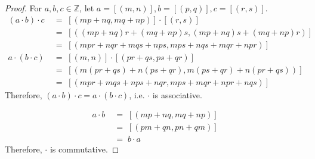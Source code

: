 \documentclass[10pt]{article}
\theoremstyle{definition}
\theoremstyle{remark}
\newcommand{\Z}{\mathbb{Z}}
\begin{document}
\begin{proof}
                For $a,b,c \in \Z$, let $a = [(m, n)], b = [(p, q)], c = [(r, s)]$.
                \begin{align*}
                        (a\cdot b)\cdot c \;&=\; [(mp + nq, mq + np)] \cdot [(r, s)] \\
                                \;&=\; [((mp + nq)r + (mq + np)s, (mp + nq)s + (mq + np)r)]\\
                                \;&=\; [(mpr + nqr + mqs + nps, mps + nqs + mqr + npr)]\\
                        a\cdot (b\cdot c) \;&=\; [(m, n)] \cdot [(pr + qs, ps + qr)] \\
                                \;&=\; [(m(pr + qs) + n(ps + qr), m(ps + qr) + n(pr + qs))] \\
                                \;&=\; [(mpr + mqs + nps + nqr, mps + mqr + npr + nqs)]
                \end{align*}
                Therefore, $(a\cdot b)\cdot c = a\cdot (b\cdot c)$, i.e. $\cdot$ is associative.
                
                \begin{align*}
                        a\cdot b \;&=\; [(mp + nq, mq + np)] \\
                                \;&=\; [(pm + qn, pn + qm)] \\
                                \;&=\; b\cdot a
                \end{align*}
                Therefore, $\cdot$ is commutative.
        \end{proof}
\end{document}
